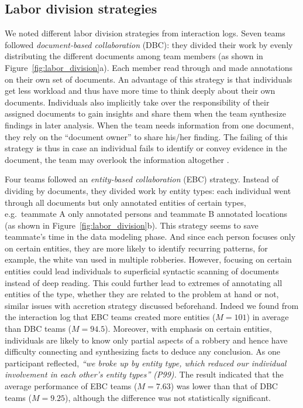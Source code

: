 \subsection{Labor division strategies}\label{labor-division-strategies}

We noted different labor division strategies from interaction logs. Seven
teams followed \emph{document-based collaboration} (DBC): they divided their
work by evenly distributing the different documents among team members
(as shown in Figure~\ref{fig:labor_division}a). Each member read
through and made annotations on their own set of documents. An advantage
of this strategy is that individuals get less workload and thus have
more time to think deeply about their own documents. Individuals also
implicitly take over the responsibility of their assigned documents to
gain insights and share them when the team synthesize findings in later
analysis. When the team needs information from one document, they rely
on the ``document owner'' to share his/her finding. The failing of this
strategy is thus in case an individual fails to identify or convey
evidence in the document, the team may overlook the information
altogether \cite{Borge2012}.

Four teams followed an \emph{entity-based collaboration} (EBC)
strategy. Instead of dividing by documents, they divided work by entity
types: each individual went through all documents but only annotated
entities of certain types, e.g.~teammate A only annotated persons and
teammate B annotated locations (as shown in
Figure~\ref{fig:labor_division}b). This strategy seems to save teammate's time in the
data modeling phase. And since each person focuses only on certain entities,
they are more likely to identify recurring patterns, for example, the
white van used in multiple robberies. However, focusing on certain
entities could lead individuals to superficial syntactic scanning of
documents instead of deep reading. This could further lead to extremes
of annotating all entities of the type, whether they are related to the
problem at hand or not, similar issues with accretion strategy discussed
beforehand. Indeed we found from the interaction log that EBC teams
created more entities ($M=101$) in average than DBC teams ($M=94.5$).
Moreover, with emphasis on certain entities,
individuals are likely to know only partial aspects of a robbery and
hence have difficulty connecting and synthesizing facts to deduce any
conclusion. As one participant reflected, \emph{``we broke up by entity
type, which reduced our individual involvement in each other's entity
types'' (P99).} The result indicated that the average performance of EBC teams ($M=7.63$) was lower
than that of DBC teams ($M=9.25$), although the difference was not statistically significant.

